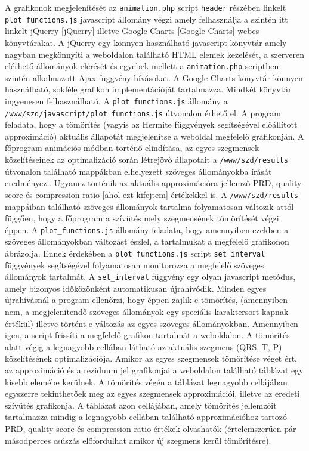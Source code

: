 \documentclass[oneside,titlepage,12pt,a4paper]{report}
\begin{document}
\par A grafikonok megjelenítését az \texttt{animation.php} script \texttt{header} részében linkelt \texttt{plot\_functions.js} javascript állomány végzi amely felhasználja a szintén itt linkelt jQuerry \ref{jQuerry} illetve Google Charts \ref{Google Charts} webes könyvtárakat. A jQuerry egy könnyen használható javascript könyvtár amely nagyban megkönnyíti a weboldalon található HTML elemek kezelését, a szerveren elérhető állományok elérését és egyebek mellett a \texttt{animation.php} scriptben szintén alkalmazott Ajax függvény hívásokat. A Google Charts könyvtár könnyen használható, sokféle grafikon implementációját tartalmazza. Mindkét könyvtár ingyenesen felhasználható. A \texttt{plot\_functions.js} állomány a \texttt{/www/szd/javascript/plot\_functions.js} útvonalon érhető el. A program feladata, hogy a tömörítés (vagyis az Hermite függvények segítségével előállított approximáció) aktuális állapotát megjelenítse a weboldal megfelelő grafikonján. A főprogram animációs módban történő elindítása, az egyes szegmensek közelítéseinek az optimalizáció során létrejövő állapotait a \texttt{/www/szd/results} útvonalon található mappákban elhelyezett szöveges állományokba írását eredményezi. Ugyanez történik az aktuális approximációra jellemző PRD, quality score és compression ratio \ref{ahol ezt kifejtem} értékekkel is. A \texttt{/www/szd/results} mappáiban található szöveges állományok tartalma folyamatosan változik attól függően, hogy a főprogram a szívütés mely szegmensének tömörítését végzi éppen. A \texttt{plot\_functions.js} állomány feladata, hogy amennyiben ezekben a szöveges állományokban változást észlel, a tartalmukat  a megfelelő grafikonon ábrázolja. Ennek érdekében a \texttt{plot\_functions.js} script \texttt{set\_interval} függvények segítségével folyamatosan monitorozza a megfelelő szöveges állományok tartalmát. A \texttt{set\_interval} függvény egy olyan javascript metódus, amely bizonyos időközönként automatikusan újrahívódik. Minden egyes újrahívásnál a program ellenőrzi, hogy éppen zajlik-e tömörítés, (amennyiben nem, a megjelenítendő szöveges állományok egy speciális karaktersort kapnak értékül) illetve történt-e változás az egyes szöveges állományokban. Amennyiben igen, a script frissíti a megfelelő grafikon tartalmát a weboldalon. A tömörítés alatt végig a legnagyobb cellában látható az aktuális szegmens (QRS, T, P) közelítésének optimalizációja. Amikor az egyes szegmensek tömörítése véget ért, az approximáció és a reziduum jel grafikonjai a weboldalon található táblázat egy kisebb elemébe kerülnek. A tömörítés végén a táblázat legnagyobb cellájában egyszerre tekinthetőek meg az egyes szegmensek approximációi, illetve az eredeti szívütés grafikonja. A táblázat azon cellájában, amely tömörítés jellemzőit tartalmazza mindig a legnagyobb cellában található approximációhoz tartozó PRD, quality score és compression ratio értékek olvashatók (értelemszerűen pár másodperces csúszás előfordulhat amikor új szegmens kerül tömörítésre). 
\end{document}
